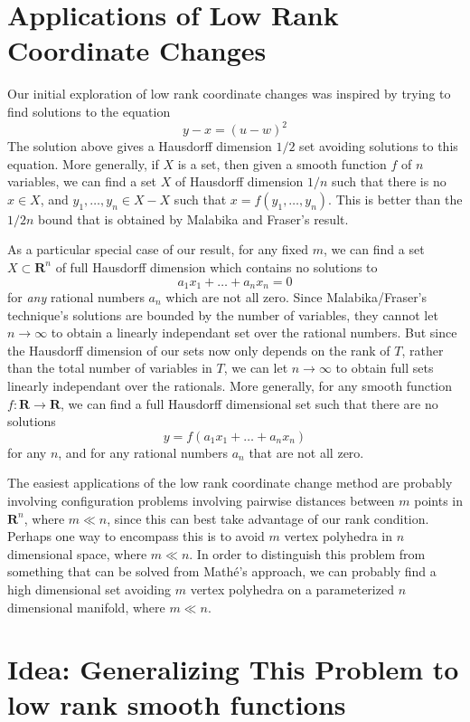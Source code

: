 \documentclass{report}
\theoremstyle{plain}
\theoremstyle{plain}
\begin{document}
\section{Applications of Low Rank Coordinate Changes}

Our initial exploration of low rank coordinate changes was inspired by trying to find solutions to the equation
%
\[ y - x = (u - w)^2 \]
%
The solution above gives a Hausdorff dimension $1/2$ set avoiding solutions to this equation. More generally, if $X$ is a set, then given a smooth function $f$ of $n$ variables, we can find a set $X$ of Hausdorff dimension $1/n$ such that there is no $x \in X$, and $y_1, \dots, y_n \in X - X$ such that $x = f(y_1, \dots, y_n)$. This is better than the $1/2n$ bound that is obtained by Malabika and Fraser's result.

As a particular special case of our result, for any fixed $m$, we can find a set $X \subset \mathbf{R}^n$ of full Hausdorff dimension which contains no solutions to
%
\[ a_1x_1 + \dots + a_nx_n = 0 \]
%
for {\it any} rational numbers $a_n$ which are not all zero. Since Malabika/Fraser's technique's solutions are bounded by the number of variables, they cannot let $n \to \infty$ to obtain a linearly independant set over the rational numbers. But since the Hausdorff dimension of our sets now only depends on the rank of $T$, rather than the total number of variables in $T$, we can let $n \to \infty$ to obtain full sets linearly independant over the rationals. More generally, for any smooth function $f: \mathbf{R} \to \mathbf{R}$, we can find a full Hausdorff dimensional set such that there are no solutions
%
\[ y = f(a_1x_1 + \dots + a_nx_n) \]
%
for any $n$, and for any rational numbers $a_n$ that are not all zero.

The easiest applications of the low rank coordinate change method are probably involving configuration problems involving pairwise distances between $m$ points in $\mathbf{R}^n$, where $m \ll n$, since this can best take advantage of our rank condition. Perhaps one way to encompass this is to avoid $m$ vertex polyhedra in $n$ dimensional space, where $m \ll n$. In order to distinguish this problem from something that can be solved from Math\'{e}'s approach, we can probably find a high dimensional set avoiding $m$ vertex polyhedra on a parameterized $n$ dimensional manifold, where $m \ll n$.

\section{Idea: Generalizing This Problem to low rank smooth functions}
\end{document}
